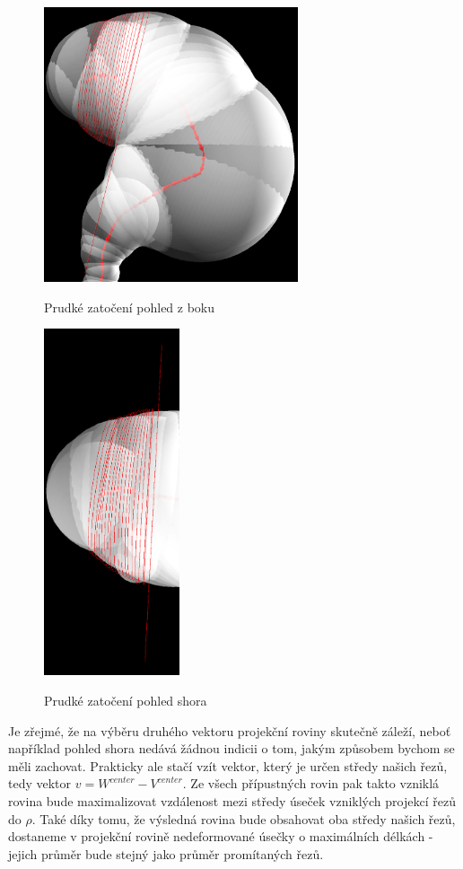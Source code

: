 \begin{figure}[ht]
\begin{minipage}{.6\textwidth}
  \centering
        \includegraphics[width=75mm]{img/sharp_curve_lookahead.png}
        \caption{Prudké zatočení pohled z boku}
    \centering
    \label{fig:sharp_curve_lookahead}
\end{minipage}%
\begin{minipage}{.4\textwidth}
    \centering
        \includegraphics[width=40mm]{img/sharp_curve_lookahead_up.png}
        \caption{Prudké zatočení pohled shora}
    \centering
    \label{fig:sharp_curve_lookahead_from_up}
\end{minipage}
\end{figure}

Je zřejmé, že na výběru druhého vektoru projekční roviny skutečně záleží, neboť
například pohled shora nedává žádnou indicii o tom, jakým způsobem bychom
se měli zachovat. Prakticky ale stačí vzít vektor, který je
určen středy našich řezů, tedy vektor $ v = W^{center} - V^{center} $. Ze všech
přípustných rovin pak takto vzniklá rovina bude maximalizovat vzdálenost mezi
středy úseček vzniklých projekcí řezů do $ \rho $. Také díky tomu, že
výsledná rovina bude obsahovat oba středy našich řezů, dostaneme v projekční
rovině nedeformované úsečky o maximálních délkách - jejich průměr bude stejný
jako průměr promítaných řezů.

